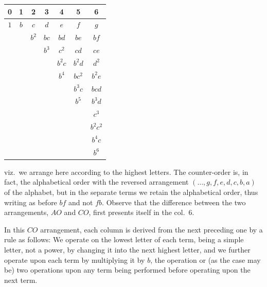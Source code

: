 \documentclass[11pt]{article}
\begin{document}
\begin{center}
\begin{tabular}{ccccccc}
0 & 1 & 2 & 3 & 4 & 5 & 6 \\
\hline
$1$ & $b$ & $c$ & $d$ & $e$ & $f$ & $g$ \\
  &   & $b^2$ & $bc$ & $bd$ & $be$ & $bf$ \\
  &   &   & $b^3$ & $c^2$ & $cd$ & $ce$ \\
  &   &   &   & $b^2 c$ & $b^2 d$ & $d^2$ \\
  &   &   &   & $b^4$ & $bc^2$ & $b^2 e$ \\
  &   &   &   &   & $b^3 c$ & $bcd$ \\
  &   &   &   &   & $b^5$ & $b^3 d$ \\
  &   &   &   &   &   & $c^3$ \\
  &   &   &   &   &   & $b^2 c^2$ \\
  &   &   &   &   &   & $b^4 c$ \\
  &   &   &   &   &   & $b^6$ \\
\end{tabular}
\end{center}

viz.\ we arrange here according to the highest letters. The counter-order is, in fact, the alphabetical order with the reversed arrangement $(\ldots, g, f, e, d, c, b, a)$ of the alphabet, but in the separate terms we retain the alphabetical order, thus writing as before $bf$ and not $fb$. Observe that the difference between the two arrangements, $AO$ and $CO$, first presents itself in the col.\ 6.

In this $CO$ arrangement, each column is derived from the next preceding one by a rule as follows: We operate on the lowest letter of each term, being a simple letter, not a power, by changing it into the next highest letter, and we further operate upon each term by multiplying it by $b$, the operation or (as the case may be) two operations upon any term being performed before operating upon the next term.
\end{document}
